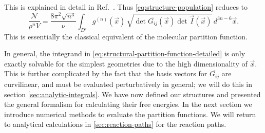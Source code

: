 \documentclass[11pt,twoside]{report}
\begin{document}
This is explained in detail in Ref.\ \cite{CatesSM2015}.
Thus \eqref{eq:structure-population} reduces to%
\begin{equation}\label{eq:structural-partition-function-detailed}
  \frac{\mathcal{N}}{\rho^n V}
  =
  \frac{8\pi^2 \sqrt{n^3}}{\nu} \int_{D'}
  g^{(n)}(\vec{x}) \,
  \sqrt{\det{\overline{G_{ij}}(\vec{x})} \det{\vec{I}(\vec{x})}}
  \, d^{3n-6} \vec{x}.
\end{equation}
This is essentially the classical equivalent of the molecular partition function.

In general, the integrand in \eqref{eq:structural-partition-function-detailed} is only exactly solvable for the simplest geometries due to the high dimensionality of $\vec{x}$.
This is further complicated by the fact that the basis vectors for $\overline{G_{ij}}$ are curvilinear, and must be evaluated perturbatively in general; we will do this in section \ref{sec:analytic-integrals}.
We have now defined our structures and presented the general formalism for calculating their free energies.
In the next section we introduce numerical methods to evaluate the partition functions.
We will return to analytical calculations in \ref{sec:reaction-paths} for the reaction paths.

\end{document}
